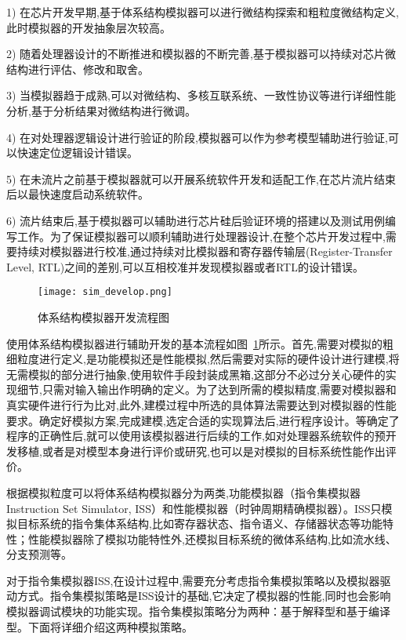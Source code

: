 1) 在芯片开发早期,基于体系结构模拟器可以进行微结构探索和粗粒度微结构定义,此时模拟器的开发抽象层次较高。


2) 随着处理器设计的不断推进和模拟器的不断完善,基于模拟器可以持续对芯片微结构进行评估、修改和取舍。


3) 当模拟器趋于成熟,可以对微结构、多核互联系统、一致性协议等进行详细性能分析,基于分析结果对微结构进行微调。


4) 在对处理器逻辑设计进行验证的阶段,模拟器可以作为参考模型辅助进行验证,可以快速定位逻辑设计错误。


5) 在未流片之前基于模拟器就可以开展系统软件开发和适配工作,在芯片流片结束后以最快速度启动系统软件。


6) 流片结束后,基于模拟器可以辅助进行芯片硅后验证环境的搭建以及测试用例编写工作\cite{brooks2000wattch}。为了保证模拟器可以顺利辅助进行处理器设计,在整个芯片开发过程中,需要持续对模拟器进行校准,通过持续对比模拟器和寄存器传输层(Register-Transfer Level, RTL)之间的差别,可以互相校准并发现模拟器或者RTL的设计错误\cite{hourui}。


\begin{figure}[h]
  \centering
  \texttt{[image: sim\_develop.png]}
  \caption{体系结构模拟器开发流程图}
  \label{fig:sim-dev-process}
\end{figure}

使用体系结构模拟器进行辅助开发的基本流程如图~\ref{fig:sim-dev-process}所示。首先,需要对模拟的粗细粒度进行定义,是功能模拟还是性能模拟,然后需要对实际的硬件设计进行建模,将无需模拟的部分进行抽象,使用软件手段封装成黑箱,这部分不必过分关心硬件的实现细节,只需对输入输出作明确的定义。为了达到所需的模拟精度,需要对模拟器和真实硬件进行行为比对,此外,建模过程中所选的具体算法需要达到对模拟器的性能要求。确定好模拟方案,完成建模,选定合适的实现算法后,进行程序设计。等确定了程序的正确性后,就可以使用该模拟器进行后续的工作,如对处理器系统软件的预开发移植,或者是对模型本身进行评价或研究,也可以是对模拟的目标系统性能作出评价。


根据模拟粒度可以将体系结构模拟器分为两类,功能模拟器（指令集模拟器Instruction  Set  Simulator, ISS）和性能模拟器（时钟周期精确模拟器）\cite{单磊2012大规模并行片上系统的分布式并行模拟关键技术研究}。ISS只模拟目标系统的指令集体系结构,比如寄存器状态、指令语义、存储器状态等功能特性；性能模拟器除了模拟功能特性外,还模拟目标系统的微体系结构,比如流水线、分支预测等\cite{cachecengcideng}。

对于指令集模拟器ISS,在设计过程中,需要充分考虑指令集模拟策略以及模拟器驱动方式。指令集模拟策略是ISS设计的基础,它决定了模拟器的性能,同时也会影响模拟器调试模块的功能实现。指令集模拟策略分为两种：基于解释型和基于编译型。下面将详细介绍这两种模拟策略。



